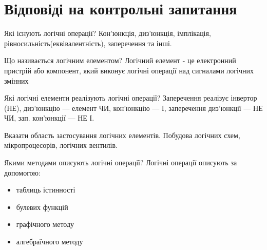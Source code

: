 \documentclass[a4paper, 12pt, oneside]{extarticle}
\begin{document}
\section*{Відповіді на контрольні запитання}
\begin{itemize}
	\question Які існують логічні операції?
		\answer Кон'юнкція, диз'юнкція, імплікація, рівносильність(еквівалентність), заперечення та інші.

	\question Що називається логічним елементом?
	\answer Логічний елемент - це електронний пристрій або компонент, який виконує логічні операції над сигналами логічних змінних

	\question Які логічні елементи реалізують логічні операції?
		\answer Заперечення реалізує інвертор (НЕ), диз'юнкцію --- елемент ЧИ, кон'юнкцію --- І, заперечення диз'юнкції --- НЕ ЧИ, зап. кон'юнкції --- НЕ І.

	\question Вказати область застосування логічних елементів.
	\answer Побудова логічних схем, мікропроцесорів, логічних вентилів.

	\question Якими методами описують логічні операції?
	\answer Логічні операції описують за допомогою:
		\begin{itemize}
	\item таблиць істинності
	\item булевих функцій
	\item графічного методу
	\item алгебраїчного методу
		\end{itemize}
\end{itemize}
\end{document}
